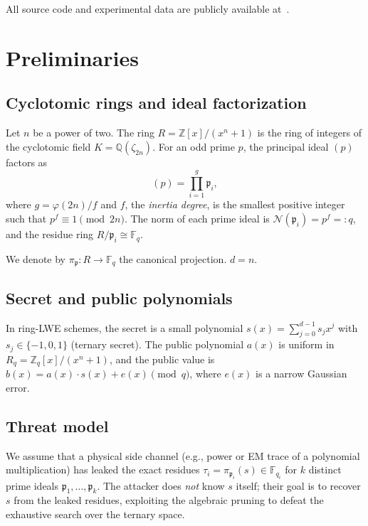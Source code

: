 \documentclass[12pt,a4paper]{article}
\begin{document}
All source code and experimental data are publicly available at~\cite{Peinador2026Repo}.

\section{Preliminaries}
\label{sec:prelim}

\subsection{Cyclotomic rings and ideal factorization}
Let $n$ be a power of two. The ring $R = \mathbb{Z}[x]/(x^n+1)$ is the ring of integers of the cyclotomic field $K = \mathbb{Q}(\zeta_{2n})$. For an odd prime $p$, the principal ideal $(p)$ factors as
\begin{equation}
(p) = \prod_{i=1}^{g} \mathfrak{p}_i,
\end{equation}
where $g = \varphi(2n)/f$ and $f$, the \emph{inertia degree}, is the smallest positive integer such that $p^f \equiv 1 \pmod{2n}$. The norm of each prime ideal is $\mathcal{N}(\mathfrak{p}_i) = p^f =: q$, and the residue ring $R/\mathfrak{p}_i \cong \mathbb{F}_q$.

We denote by $\pi_{\mathfrak{p}} : R \to \mathbb{F}_q$ the canonical projection. $d=n$.

\subsection{Secret and public polynomials}
In ring-LWE schemes, the secret is a small polynomial $s(x) = \sum_{j=0}^{d-1} s_j x^j$ with $s_j \in \{-1,0,1\}$ (ternary secret). The public polynomial $a(x)$ is uniform in $R_q = \mathbb{Z}_q[x]/(x^n+1)$, and the public value is $b(x) = a(x) \cdot s(x) + e(x) \pmod{q}$, where $e(x)$ is a narrow Gaussian error.

\subsection{Threat model}
We assume that a physical side channel (e.g., power or EM trace of a polynomial multiplication) has leaked the exact residues $\tau_i = \pi_{\mathfrak{p}_i}(s) \in \mathbb{F}_{q_i}$ for $k$ distinct prime ideals $\mathfrak{p}_1,\dots,\mathfrak{p}_k$. The attacker does \emph{not} know $s$ itself; their goal is to recover $s$ from the leaked residues, exploiting the algebraic pruning to defeat the exhaustive search over the ternary space.
\end{document}
